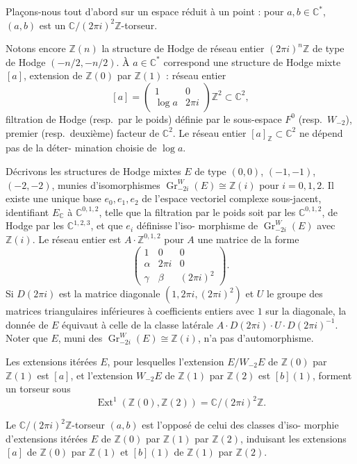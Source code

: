 \documentclass[12pt,a4paper]{article}
\theoremstyle{plain}
\theoremstyle{definition}
\theoremstyle{remark}
\DeclareMathOperator{\Ext}{Ext}
\DeclareMathOperator{\Gr}{Gr}
\newcommand{\Z}{\mathbb{Z}}
\newcommand{\C}{\mathbb{C}}
\providecommand{\Ext}{\operatorname{Ext}}
\begin{document}
Plaçons-nous tout d'abord sur un espace réduit à un point : pour $a, b \in \C^*$, $(a,b)$
est un $\C/(2\pi i)^2\Z$-torseur.

Notons encore $\Z(n)$ la structure de Hodge de réseau entier $(2\pi i)^n\Z$ de type de
Hodge $(-n/2, -n/2)$. À $a \in \C^*$ correspond une structure de Hodge mixte $[a]$, extension
de $\Z(0)$ par $\Z(1)$ : réseau entier
\[
[a] = \begin{pmatrix} 1 & 0 \\ \log a & 2\pi i \end{pmatrix} \Z^2 \subset \C^2,
\]
filtration de Hodge (resp.~par le poids) définie par le sous-espace $F^0$ (resp.~$W_{-2}$), premier
(resp.~deuxième) facteur de $\C^2$. Le réseau entier $[a]_\Z \subset \C^2$ ne dépend pas de la déter-
mination choisie de $\log a$.

Décrivons les structures de Hodge mixtes $E$ de type $(0,0)$, $(-1,-1)$, $(-2,-2)$,
munies d'isomorphismes $\Gr_{-2i}^W(E) \cong \Z(i)$ pour $i = 0, 1, 2$. Il existe une unique base
$e_0, e_1, e_2$ de l'espace vectoriel complexe sous-jacent, identifiant $E_\C$ à $\C^{0,1,2}$, telle que la
filtration par le poids soit par les $\C^{0,1,2}$, de Hodge par les $\C^{1,2,3}$, et que $e_i$ définisse l'iso-
morphisme de $\Gr_{-2i}^W(E)$ avec $\Z(i)$. Le réseau entier est $A \cdot \Z^{0,1,2}$ pour $A$ une matrice de
la forme
\[
\begin{pmatrix}
1 & 0 & 0 \\
\alpha & 2\pi i & 0 \\
\gamma & \beta & (2\pi i)^2
\end{pmatrix}.
\]
Si $D(2\pi i)$ est la matrice diagonale $(1, 2\pi i, (2\pi i)^2)$ et $U$ le groupe des matrices triangulaires
inférieures à coefficients entiers avec $1$ sur la diagonale, la donnée de $E$ équivaut à celle
de la classe latérale $A \cdot D(2\pi i) \cdot U \cdot D(2\pi i)^{-1}$. Noter que $E$, muni des $\Gr_{-2i}^W(E) \cong \Z(i)$, n'a
pas d'automorphisme.

Les extensions itérées $E$, pour lesquelles l'extension $E/W_{-2}E$ de $\Z(0)$ par $\Z(1)$
est $[a]$, et l'extension $W_{-2}E$ de $\Z(1)$ par $\Z(2)$ est $[b](1)$, forment un torseur sous
\[
\Ext^1(\Z(0), \Z(2)) = \C/(2\pi i)^2\Z.
\]

\begin{construction}
Le $\C/(2\pi i)^2\Z$-torseur $(a,b)$ est l'opposé de celui des classes d'iso-
morphie d'extensions itérées $E$ de $\Z(0)$ par $\Z(1)$ par $\Z(2)$, induisant les extensions $[a]$ de $\Z(0)$
par $\Z(1)$ et $[b](1)$ de $\Z(1)$ par $\Z(2)$.
\end{construction}
\end{document}
